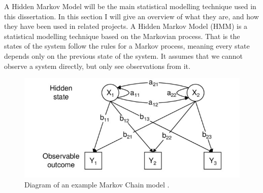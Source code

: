 \documentclass{article}
\begin{document}





A Hidden Markov Model will be the main statistical modelling technique used in this dissertation.
In this section I will give an overview of what they are, and how they have been used in related projects.
A Hidden Markov Model (HMM) is a statistical modelling technique based on the Markovian process. %
That is the states of the system follow the rules for a Markov process, meaning every state depends only on the previous state of the system.
It assumes that we cannot observe a system directly, but only see observations from it.

\begin{figure}[ht!]
    \centering
    \includegraphics[scale=1.5]{Images/HMM-Paper-Diagram.png}
    \caption{Diagram of an example Markov Chain model \cite{choudhury2007state}.}
    \label{fig:Markov}
\end{figure}
\end{document}
